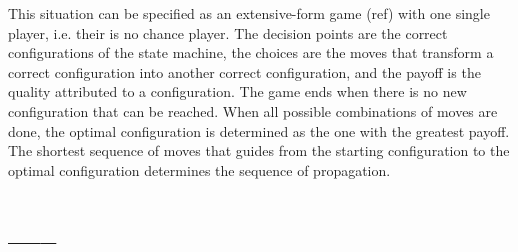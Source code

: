\documentclass[12pt,a4paper]{scrartcl}
\begin{document}
This situation can be specified as an extensive-form game (ref) with one single
player, i.e. their is no chance player. The decision points are the correct
configurations of the state machine, the choices are the moves that transform a
correct configuration into another correct configuration, and the payoff is the
quality attributed to a configuration. The game ends when there is no new
configuration that can be reached. When all possible combinations of moves are
done, the optimal configuration is determined as the one with the greatest
payoff. The shortest sequence of moves that guides from the starting
configuration to the optimal configuration determines the sequence of
propagation.


\section{-----}
\end{document}

